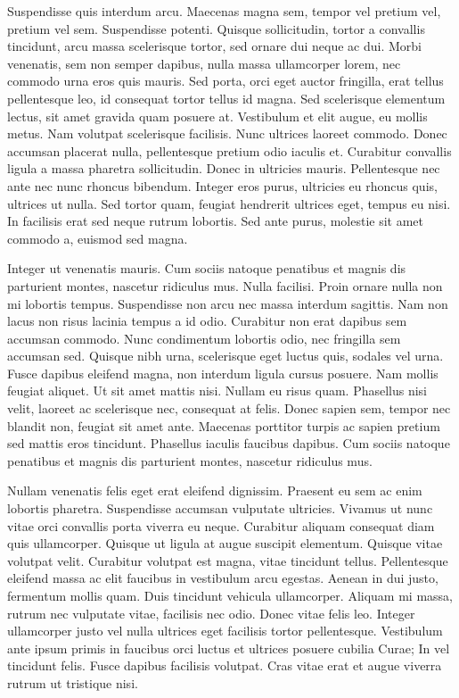 Suspendisse quis interdum arcu.
Maecenas magna sem, tempor vel pretium vel, pretium vel sem.
Suspendisse potenti.
Quisque sollicitudin, tortor a convallis tincidunt, arcu massa scelerisque tortor, sed ornare dui neque ac dui.
Morbi venenatis, sem non semper dapibus, nulla massa ullamcorper lorem, nec commodo urna eros quis mauris.
Sed porta, orci eget auctor fringilla, erat tellus pellentesque leo, id consequat tortor tellus id magna.
Sed scelerisque elementum lectus, sit amet gravida quam posuere at.
Vestibulum et elit augue, eu mollis metus.
Nam volutpat scelerisque facilisis.
Nunc ultrices laoreet commodo.
Donec accumsan placerat nulla, pellentesque pretium odio iaculis et.
Curabitur convallis ligula a massa pharetra sollicitudin.
Donec in ultricies mauris.
Pellentesque nec ante nec nunc rhoncus bibendum.
Integer eros purus, ultricies eu rhoncus quis, ultrices ut nulla.
Sed tortor quam, feugiat hendrerit ultrices eget, tempus eu nisi.
In facilisis erat sed neque rutrum lobortis.
Sed ante purus, molestie sit amet commodo a, euismod sed magna.

Integer ut venenatis mauris.
Cum sociis natoque penatibus et magnis dis parturient montes, nascetur ridiculus mus.
Nulla facilisi.
Proin ornare nulla non mi lobortis tempus.
Suspendisse non arcu nec massa interdum sagittis.
Nam non lacus non risus lacinia tempus a id odio.
Curabitur non erat dapibus sem accumsan commodo.
Nunc condimentum lobortis odio, nec fringilla sem accumsan sed.
Quisque nibh urna, scelerisque eget luctus quis, sodales vel urna.
Fusce dapibus eleifend magna, non interdum ligula cursus posuere.
Nam mollis feugiat aliquet.
Ut sit amet mattis nisi.
Nullam eu risus quam.
Phasellus nisi velit, laoreet ac scelerisque nec, consequat at felis.
Donec sapien sem, tempor nec blandit non, feugiat sit amet ante.
Maecenas porttitor turpis ac sapien pretium sed mattis eros tincidunt.
Phasellus iaculis faucibus dapibus.
Cum sociis natoque penatibus et magnis dis parturient montes, nascetur ridiculus mus.

Nullam venenatis felis eget erat eleifend dignissim.
Praesent eu sem ac enim lobortis pharetra.
Suspendisse accumsan vulputate ultricies.
Vivamus ut nunc vitae orci convallis porta viverra eu neque.
Curabitur aliquam consequat diam quis ullamcorper.
Quisque ut ligula at augue suscipit elementum.
Quisque vitae volutpat velit.
Curabitur volutpat est magna, vitae tincidunt tellus.
Pellentesque eleifend massa ac elit faucibus in vestibulum arcu egestas.
Aenean in dui justo, fermentum mollis quam.
Duis tincidunt vehicula ullamcorper.
Aliquam mi massa, rutrum nec vulputate vitae, facilisis nec odio.
Donec vitae felis leo.
Integer ullamcorper justo vel nulla ultrices eget facilisis tortor pellentesque.
Vestibulum ante ipsum primis in faucibus orci luctus et ultrices posuere cubilia Curae; In vel tincidunt felis.
Fusce dapibus facilisis volutpat.
Cras vitae erat et augue viverra rutrum ut tristique nisi.

